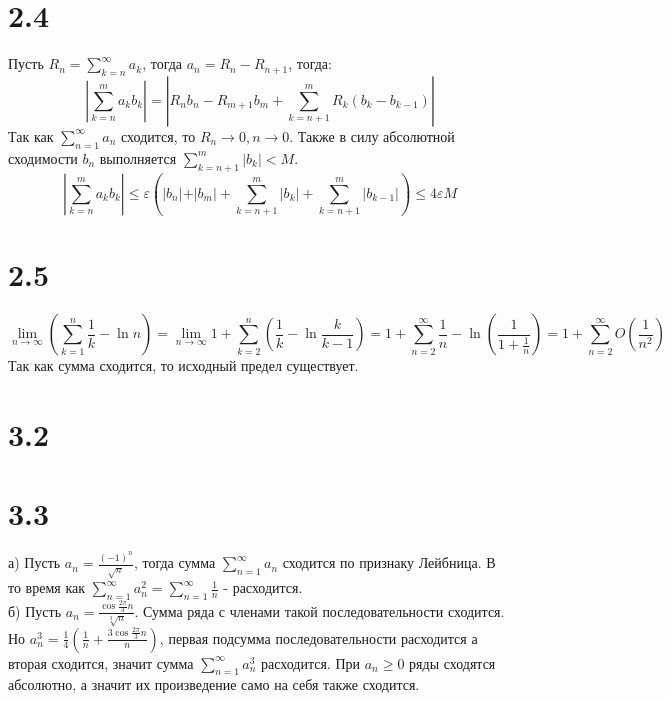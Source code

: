 \documentclass[12pt]{article}
\begin{document}
\section{2.4}
Пусть $R_n = \sum_{k=n}^{\infty} a_k$, тогда $a_n = R_n - R_{n+1}$, тогда:
\[
    \left| \sum_{k=n}^{m} a_k b_k \right| = \left| R_n b_n - R_{m+1} b_m + \sum_{k=n+1}^{m} R_k(b_k - b_{k-1}) \right|
\]
Так как $\sum_{n=1}^{\infty} a_n$ сходится, то $R_n \to 0, n \to 0$. Также в силу абсолютной сходимости $b_n$ выполняется 
$\sum_{k=n+1}^{m} \vert b_k \vert < M$. 
\[
    \left| \sum_{k=n}^{m} a_k b_k \right| \leq \varepsilon \left( \vert b_n \vert + \vert b_m \vert + \sum_{k=n+1}^{m} \vert b_k \vert + \sum_{k=n+1}^{m} \vert b_{k-1} \vert \right) \leq  4 \varepsilon M 
\]

\section{2.5}
\[
    \lim_{n \to \infty} \left( \sum_{k=1}^{n} \frac{1}{k} - \ln n \right) = \lim_{n \to \infty} 1 + \sum_{k=2}^{n} \left( \frac{1}{k} - \ln \frac{k}{k-1} \right) = 
    1 + \sum_{n=2}^{\infty} \frac{1}{n} - \ln \left( \frac{1}{1 + \frac{1}{n}} \right) = 1 + \sum_{n=2}^{\infty} O(\frac{1}{n^2})  
\]
Так как сумма сходится, то исходный предел существует.

\section{3.2}


\section{3.3}
а) Пусть $a_n = \frac{(-1)^n}{\sqrt{n}}$, тогда сумма $\sum_{n=1}^{\infty} a_n$ сходится по признаку Лейбница. В то время как 
$\sum_{n=1}^{\infty} a_n^2 = \sum_{n=1}^{\infty} \frac{1}{n}$ - расходится. 
\\ б) Пусть $a_n = \frac{\cos \frac{2\pi}{3}n}{\sqrt[3]{n} }$. Сумма ряда с членами такой последовательности сходится. Но 
$a_n^3 = \frac{1}{4} \left( \frac{1}{n} + \frac{3\cos \frac{2\pi}{3}n}{n} \right)$, первая подсумма последовательности расходится а вторая сходится, 
значит сумма $\sum_{n=1}^{\infty} a_n^3$ расходится.  
При $a_n \geq 0$ ряды сходятся абсолютно, а значит их произведение само на себя также сходится. 
\end{document}
